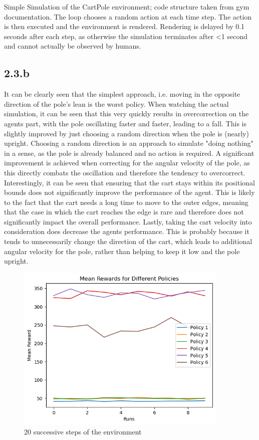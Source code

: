 \documentclass{article} %
\begin{document}
	Simple Simulation of the CartPole environment; 
	code structure taken from gym documentation. The loop chooses a random action at each time step.
	The action is then executed and the environment is rendered. Rendering is delayed by 0.1 seconds after each step,
	as otherwise the simulation terminates after <1 second and cannot actually be observed by humans.
	
	
	
	\subsection{2.3.b}
	It can be clearly seen that the simplest approach, i.e. moving in the opposite direction of the pole's lean is the worst policy. When watching the actual simulation, it can be seen that this very quickly results in overcorrection on the agents part, with the pole oscillating faster and faster, leading to a fall. This is slightly improved by just choosing a random direction when the pole is (nearly) upright. Choosing a random direction is an approach to simulate "doing nothing" in a sense, as the pole is already balanced and no action is required. A significant improvement is achieved when correcting for the angular velocity of the pole, as this directly combats the oscillation and therefore the tendency to overcorrect. 
	Interestingly, it can be seen that ensuring that the cart stays within its positional bounds does not significantly improve the performance of the agent. This is likely to the fact that the cart needs a long time to move to the outer edges, meaning that the case in which the cart reaches the edge is rare and therefore does not significantly impact the overall performance. Lastly, taking the cart velocity into consideration does decrease the agents performance. This is probably because it tends to  unnecessarily change the direction of the cart, which leads to additional angular velocity for the pole, rather than helping to keep it low and the pole upright.
	
	
	\begin{figure}[h!]
		\centering
		\includegraphics[width=0.9\textwidth]{images/mean_reward.png}
		\caption{20 successive steps of the environment}
		\label{fig:5}
	\end{figure}
\end{document}
